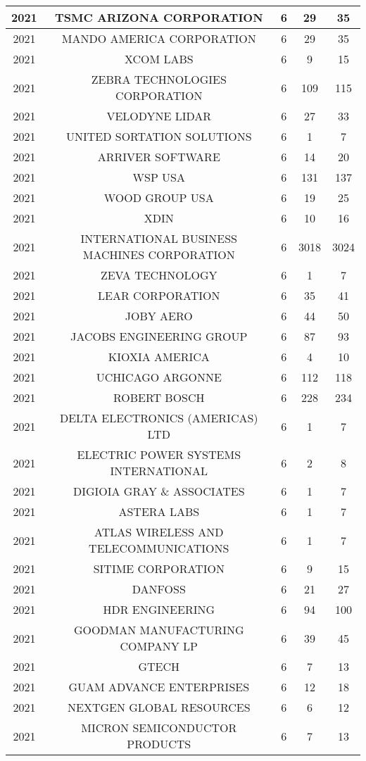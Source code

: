 \documentclass{article}%
\begin{document}
\begin{longtable}{c|c|c|c|c}
\hline%
2021&TSMC ARIZONA CORPORATION&6&29&35\\%
\hline%
2021&MANDO AMERICA CORPORATION&6&29&35\\%
\hline%
2021&XCOM LABS&6&9&15\\%
\hline%
2021&ZEBRA TECHNOLOGIES CORPORATION&6&109&115\\%
\hline%
2021&VELODYNE LIDAR&6&27&33\\%
\hline%
2021&UNITED SORTATION SOLUTIONS&6&1&7\\%
\hline%
2021&ARRIVER SOFTWARE&6&14&20\\%
\hline%
2021&WSP USA&6&131&137\\%
\hline%
2021&WOOD GROUP USA&6&19&25\\%
\hline%
2021&XDIN&6&10&16\\%
\hline%
2021&INTERNATIONAL BUSINESS MACHINES CORPORATION&6&3018&3024\\%
\hline%
2021&ZEVA TECHNOLOGY&6&1&7\\%
\hline%
2021&LEAR CORPORATION&6&35&41\\%
\hline%
2021&JOBY AERO&6&44&50\\%
\hline%
2021&JACOBS ENGINEERING GROUP&6&87&93\\%
\hline%
2021&KIOXIA AMERICA&6&4&10\\%
\hline%
2021&UCHICAGO ARGONNE&6&112&118\\%
\hline%
2021&ROBERT BOSCH&6&228&234\\%
\hline%
2021&DELTA ELECTRONICS (AMERICAS) LTD&6&1&7\\%
\hline%
2021&ELECTRIC POWER SYSTEMS INTERNATIONAL&6&2&8\\%
\hline%
2021&DIGIOIA GRAY \& ASSOCIATES&6&1&7\\%
\hline%
2021&ASTERA LABS&6&1&7\\%
\hline%
2021&ATLAS WIRELESS AND TELECOMMUNICATIONS&6&1&7\\%
\hline%
2021&SITIME CORPORATION&6&9&15\\%
\hline%
2021&DANFOSS&6&21&27\\%
\hline%
2021&HDR ENGINEERING&6&94&100\\%
\hline%
2021&GOODMAN MANUFACTURING COMPANY LP&6&39&45\\%
\hline%
2021&GTECH&6&7&13\\%
\hline%
2021&GUAM ADVANCE ENTERPRISES&6&12&18\\%
\hline%
2021&NEXTGEN GLOBAL RESOURCES&6&6&12\\%
\hline%
2021&MICRON SEMICONDUCTOR PRODUCTS&6&7&13\\%

\end{longtable}
\end{document}

